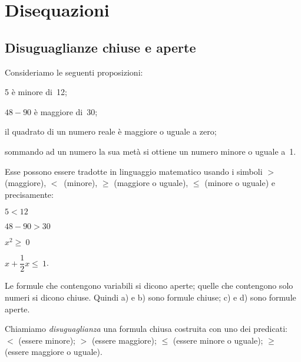 


\chapter{Disequazioni}

\section{Disuguaglianze chiuse e aperte}
\label{sec:dis_disguagianze}

Consideriamo le seguenti proposizioni:

\begin{enumeratea}
\item 5 è minore di~12;
\item \(48-90\) è maggiore di~30;
\item il quadrato di un numero reale è maggiore o uguale a zero;
\item sommando ad un numero la sua metà si ottiene un numero minore
o uguale a~1.
\end{enumeratea}

Esse possono essere tradotte in linguaggio matematico usando i simboli
\(>\) (maggiore), \(<\)~(minore), \({\geq}\) (maggiore o uguale), \({\leq}\) 
(minore o uguale) e precisamente:

\begin{multicols}{4}
 \begin{enumeratea}
\item \(5<12\)
\item \(48-90>30\)
\item \(x^{2}\ge~0\)
\item \(x+\dfrac{1}{2}x\le~1\).
 \end{enumeratea}
\end{multicols}

Le formule che contengono variabili si dicono aperte; quelle che
contengono solo numeri si dicono chiuse. Quindi a) e b) sono formule
chiuse; c) e d) sono formule aperte.

\begin{definizione}
Chiamiamo \emph{disuguaglianza} una formula chiusa
costruita con uno dei predicati:~\(<\) (essere minore);
\(>\) (essere maggiore); \({\leq}\) (essere minore o uguale);
\({\geq}\) (essere maggiore o uguale).
\end{definizione}

